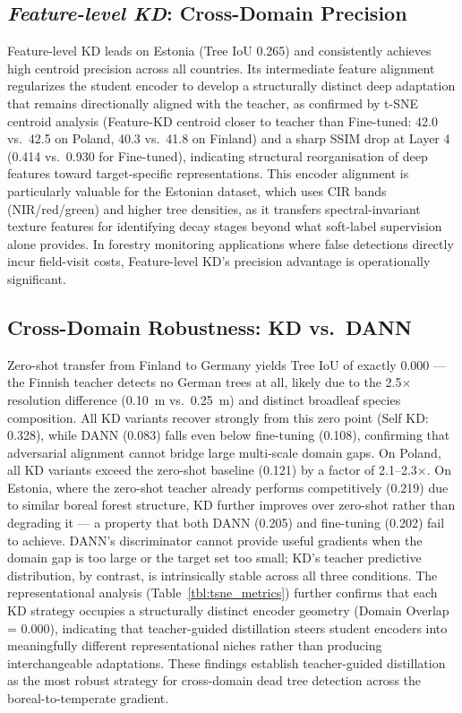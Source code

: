 \documentclass[twocolumn]{article}
\begin{document}
\subsection{\textit{Feature-level KD}: Cross-Domain Precision}
Feature-level KD leads on Estonia (Tree IoU 0.265) and consistently achieves high centroid precision across all countries. Its intermediate feature alignment regularizes the student encoder to develop a structurally distinct deep adaptation that remains directionally aligned with the teacher, as confirmed by t-SNE centroid analysis (Feature-KD centroid closer to teacher than Fine-tuned: 42.0 vs.\ 42.5 on Poland, 40.3 vs.\ 41.8 on Finland) and a sharp SSIM drop at Layer 4 (0.414 vs.\ 0.930 for Fine-tuned), indicating structural reorganisation of deep features toward target-specific representations. This encoder alignment is particularly valuable for the Estonian dataset, which uses CIR bands (NIR/red/green) and higher tree densities, as it transfers spectral-invariant texture features for identifying decay stages beyond what soft-label supervision alone provides. In forestry monitoring applications where false detections directly incur field-visit costs, Feature-level KD's precision advantage is operationally significant.

\subsection{Cross-Domain Robustness: KD vs.\ DANN}
Zero-shot transfer from Finland to Germany yields Tree IoU of exactly 0.000 --- the Finnish teacher detects no German trees at all, likely due to the 2.5$\times$ resolution difference (0.10~m vs.\ 0.25~m) and distinct broadleaf species composition. All KD variants recover strongly from this zero point (Self KD: 0.328), while DANN (0.083) falls even below fine-tuning (0.108), confirming that adversarial alignment cannot bridge large multi-scale domain gaps. On Poland, all KD variants exceed the zero-shot baseline (0.121) by a factor of 2.1--2.3$\times$. On Estonia, where the zero-shot teacher already performs competitively (0.219) due to similar boreal forest structure, KD further improves over zero-shot rather than degrading it --- a property that both DANN (0.205) and fine-tuning (0.202) fail to achieve. DANN's discriminator cannot provide useful gradients when the domain gap is too large or the target set too small; KD's teacher predictive distribution, by contrast, is intrinsically stable across all three conditions. The representational analysis (Table~\ref{tbl:tsne_metrics}) further confirms that each KD strategy occupies a structurally distinct encoder geometry (Domain Overlap = 0.000), indicating that teacher-guided distillation steers student encoders into meaningfully different representational niches rather than producing interchangeable adaptations. These findings establish teacher-guided distillation as the most robust strategy for cross-domain dead tree detection across the boreal-to-temperate gradient.
\end{document}
